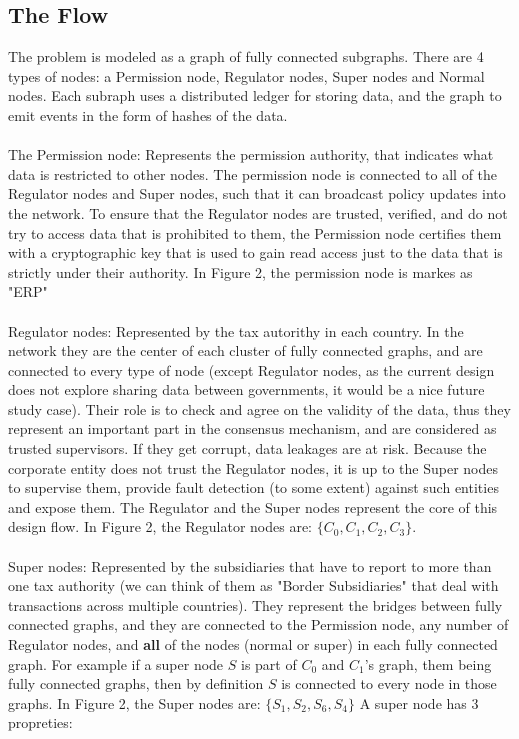 \subsection{The Flow}
The problem is modeled as a graph of fully connected subgraphs. There are 4 types of nodes: a Permission node, Regulator nodes, Super nodes and Normal nodes. Each subraph uses a distributed ledger for storing data, and the graph to emit events in the form of hashes of the data.\\
\\
The Permission node: Represents the permission authority, that indicates what data is restricted to other nodes. The permission node is connected to all of the Regulator nodes and Super nodes, such that it can broadcast policy updates into the network. To ensure that the Regulator nodes are trusted, verified, and do not try to access data that is prohibited to them, the Permission node certifies them with a cryptographic key that is used to gain read access just to the data that is strictly under their authority. In Figure 2, the permission node is markes as "ERP"\\
\\
Regulator nodes: Represented by the tax autorithy in each country. In the network they are the center of each cluster of fully connected graphs, and are connected to every type of node (except Regulator nodes, as the current design does not explore sharing data between governments, it would be a nice future study case). Their role is to check and agree on the validity of the data, thus they represent an important part in the consensus mechanism, and are considered as trusted supervisors. If they get corrupt, data leakages are at risk. Because the corporate entity does not trust the Regulator nodes, it is up to the Super nodes to supervise them, provide fault detection (to some extent) against such entities and expose them. The Regulator and the Super nodes represent the core of this design flow. In Figure 2, the Regulator nodes are: $\{C_0,C_1,C_2,C_3\}$.\\
\\
Super nodes: Represented by the subsidiaries that have to report to more than one tax authority (we can think of them as "Border Subsidiaries" that deal with transactions across multiple countries). They represent the bridges between fully connected graphs, and they are connected to the Permission node, any number of Regulator nodes, and \textbf{all} of the nodes (normal or super) in each fully connected graph. For example if a super node $S$ is part of $C_0$ and $C_1$'s graph, them being fully connected graphs, then by definition $S$ is connected to every node in those graphs. In Figure 2, the Super nodes are: $\{S_1, S_2, S_6, S_4\}$ A super node has 3 propreties:\\
